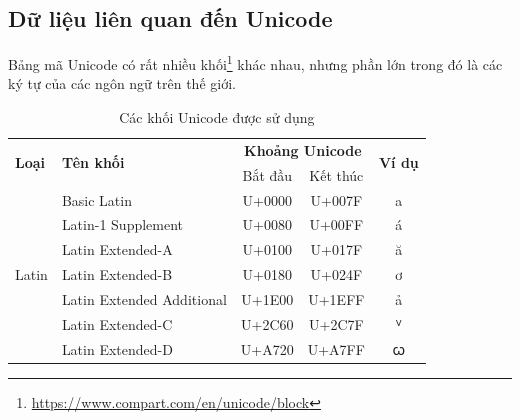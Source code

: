 \newpage
\subsection*{Dữ liệu liên quan đến Unicode}
Bảng mã Unicode có rất nhiều khối\footnote{\url{https://www.compart.com/en/unicode/block}} khác nhau, nhưng phần lớn trong đó là các ký tự của các ngôn ngữ trên thế giới.
\begin{table}[htb]
    \centering
    \caption{Các khối Unicode được sử dụng}
    \label{table:unicode-blocks}
    \begin{threeparttable}
        \begin{tabular}{llccc}
            \toprule
            \multirow{2}{*}{\textbf{Loại}} & \multirow{2}{*}{\textbf{Tên khối}}      & \multicolumn{2}{c}{\textbf{Khoảng Unicode}} & \multirow{2}{*}{ \textbf{Ví dụ}}     \\\cmidrule(lr){3-4}
                                           &                                         & Bắt đầu                                     & Kết thúc                         &   \\\midrule
            \multirow{8}{*}{Latin}         & Basic Latin                             & U+0000                                      & U+007F                           & a \\
                                           & Latin-1 Supplement                      & U+0080                                      & U+00FF                           & á \\
                                           & Latin Extended-A                        & U+0100                                      & U+017F                           & ă \\
                                           & Latin Extended-B                        & U+0180                                      & U+024F                           & ơ \\
                                           & Latin Extended Additional               & U+1E00                                      & U+1EFF                           & ả \\
                                           & Latin Extended-C                        & U+2C60                                      & U+2C7F                           & ⱽ \\
                                           & Latin Extended-D                        & U+A720                                      & U+A7FF                           & ꞷ \\

\end{tabular}
\end{threeparttable}
\end{table}
